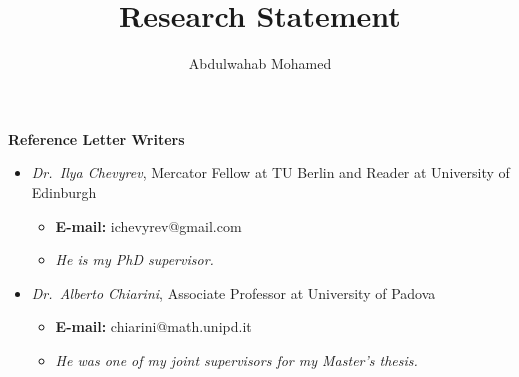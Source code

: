\documentclass[11pt]{article}
\title{Research Statement}
\author{Abdulwahab Mohamed}
\numberwithin{equation}{section}
\theoremstyle{definition}
\theoremstyle{remark}
\newcommand{\1}{\mathbf 1}
\newcommand{\<}{\langle}
\renewcommand{\>}{\rangle}
\begin{document}
\vspace{-10pt}

{\Large \textbf{Reference Letter Writers}} \\ \vspace{1pt}

\begin{itemize}
    \item \textit{Dr.\ Ilya Chevyrev}, Mercator Fellow at TU Berlin and Reader at University of Edinburgh
    \begin{itemize}
        \item \textbf{E-mail:} {ichevyrev@gmail.com}
        \item \textit{He is my PhD supervisor.}
    \end{itemize}
    \item \textit{Dr.\ Alberto Chiarini}, Associate Professor at University of Padova
    \begin{itemize}
        \item \textbf{E-mail:} {chiarini@math.unipd.it}
        \item \textit{He was one of my joint supervisors for my Master’s thesis.}
    \end{itemize}
\end{itemize}
\end{document}
